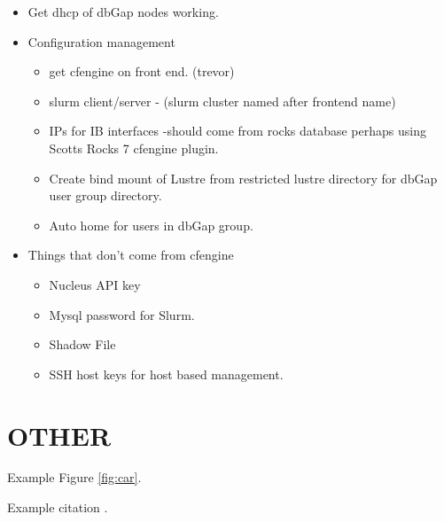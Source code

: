 \begin{itemize}
\item
  Get dhcp of dbGap nodes working.
\item
  Configuration management~

  \begin{itemize}
  \item
    get cfengine on front end. (trevor)
  \item
    slurm client/server - (slurm cluster named after frontend name)
  \item
    IPs for IB interfaces -should come from rocks database perhaps using
    Scotts Rocks 7 cfengine plugin.
  \item
    Create bind mount of Lustre from restricted lustre directory for
    dbGap user group directory.
  \item
    Auto home for users in dbGap group.
  \end{itemize}
\item
  Things that don't come from cfengine

  \begin{itemize}
  \item
    Nucleus API key
  \item
    Mysql password for Slurm.
  \item
    Shadow File
  \item
    SSH host keys for host based management.
  \end{itemize}
\end{itemize}


\section{OTHER}

Example Figure \ref{fig:car}.

Example citation \cite{comet17tails}.

